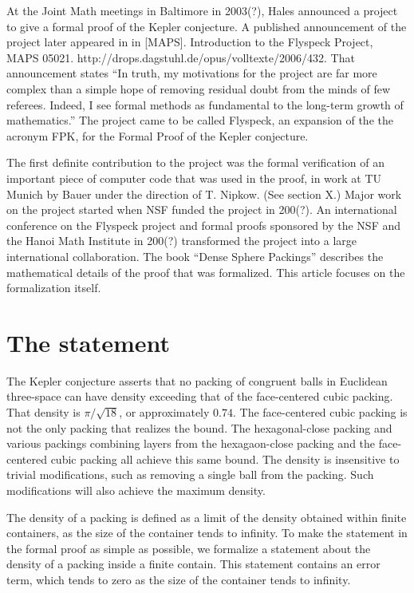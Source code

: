 At the Joint Math meetings in Baltimore in
2003(?), Hales announced
a project to give a formal proof of the Kepler conjecture.   A published announcement of the project later appeared in
in [MAPS].  {Introduction to the Flyspeck Project, MAPS 05021. http://drops.dagstuhl.de/opus/volltexte/2006/432}.
That announcement states ``In truth, my motivations for the project are far more complex than a simple hope of 
removing residual doubt from the minds of few referees. 
Indeed, I see formal methods as fundamental to the long-term growth of mathematics.''
The project came to be called Flyspeck, an expansion of the the acronym FPK, for the Formal Proof of the Kepler conjecture.



The first  definite contribution to the project was the formal verification of an important piece of
computer code that was used in the proof, in work at TU Munich by Bauer under the direction of T. Nipkow. (See section X.)
Major work on the project started when NSF funded
the project in 200(?).   An international conference on the Flyspeck project and formal proofs sponsored by the NSF and the
Hanoi Math Institute in 200(?) transformed the project into a large international collaboration.
The book ``Dense Sphere Packings'' describes the mathematical details of the proof that was formalized.  This article
focuses on the formalization itself.



\section{The statement}

The Kepler conjecture asserts that no packing of congruent balls in Euclidean three-space can have density exceeding
that of the face-centered cubic packing.  That density is $\pi/\sqrt{18}$, or approximately $0.74$.    The face-centered
cubic packing is not the only packing that realizes the bound.   The hexagonal-close packing and various packings
combining layers from the hexagaon-close packing and the face-centered cubic packing all achieve this same bound.
The density is insensitive to trivial modifications, such as removing a single ball from the packing.   Such modifications
will also achieve the maximum density.

The density of a packing is defined as a limit of the density obtained within finite containers, as the size of the container
tends to infinity.  To make the statement in the formal proof as simple as possible, we formalize a statement about the
density of a packing inside a finite contain.  This statement contains an error term, which tends to zero as the size of
the container tends to infinity.

